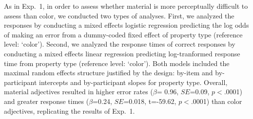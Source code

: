 \documentclass[12pt,letterpaper]{article}
\begin{document}
As in Exp.~1, in order to assess whether material is more perceptually difficult to assess than color, we conducted two types of analyses. First, we analyzed the responses by conducting a mixed effects logistic regression predicting the log odds of making an error from a dummy-coded fixed effect of property type (reference level: `color'). Second, we analyzed the response times of correct responses by conducting a mixed effects linear regression predicting log-tranformed response time from property type  (reference level: `color'). Both models included the maximal random effects structure justified by the design: by-item and by-participant intercepts and by-participant slopes for property type. Overall, material adjectives resulted in higher error rates ($\beta$= 0.96, $SE$=0.09, $p$$<$.0001) and greater response times ($\beta$=0.24, $SE$=0.018, t=-59.62, $p$$<$.0001) than color adjectives, replicating the results of Exp.~1. 
\end{document}
